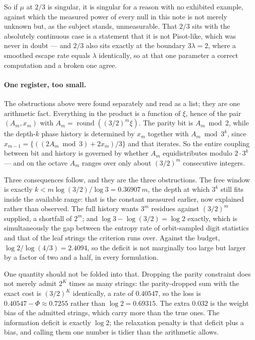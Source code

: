 \documentclass[11pt]{article}
\theoremstyle{remark}
\newcommand{\lam}{\lambda}
\begin{document}
So if $\mu$ at $2/3$ is singular, it is singular for a reason with no exhibited example, against which the
measured power of every null in this note is not merely unknown but, as the subject stands, unmeasurable.
That $2/3$ sits with the absolutely continuous case is a statement that it is not Pisot-like, which was
never in doubt --- and $2/3$ also sits exactly at the boundary $3\lam=2$, where a smoothed escape rate
equals $\lam$ identically, so at that one parameter a correct computation and a broken one agree.

\paragraph{One register, too small.} The obstructions above were found separately and read as a list; they
are one arithmetic fact. Everything in the product is a function of $\xi$, hence of the pair
$(A_m,x_m)$ with $A_m=\operatorname{round}((3/2)^m\xi)$. The parity bit is $A_m\bmod2$, while the depth-$k$
phase history is determined by $x_m$ together with $A_m\bmod3^k$, since
$x_{m-1}=\{((2A_m\bmod3)+2x_m)/3\}$ and that iterates. So the entire coupling between bit and history is
governed by whether $A_m$ equidistributes modulo $2\cdot3^k$ --- and on the octave $A_m$ ranges over only
about $(3/2)^m$ consecutive integers.

Three consequences follow, and they are the three obstructions. The free window is exactly
$k<m\log(3/2)/\log3=0.36907\,m$, the depth at which $3^k$ still fits inside the available range: that is
the constant measured earlier, now explained rather than observed. The full history wants $3^m$ residues
against $(3/2)^m$ supplied, a shortfall of $2^m$; and $\log3-\log(3/2)=\log2$ exactly, which is
simultaneously the gap between the entropy rate of orbit-sampled digit statistics and that of the leaf
strings the criterion runs over. Against the budget, $\log2/\log(4/3)=2.4094$, so the deficit is not
marginally too large but larger by a factor of two and a half, in every formulation.

One quantity should not be folded into that. Dropping the parity constraint does not merely admit $2^K$
times as many strings: the parity-dropped sum with the exact cost is $(3/2)^K$ identically, a rate of
$0.40547$, so the loss is $0.40547-\Phi\approx0.7255$ rather than $\log2=0.69315$. The extra $0.032$ is the
weight bias of the admitted strings, which carry more than the true ones. The information deficit is
exactly $\log2$; the relaxation penalty is that deficit plus a bias, and calling them one number is tidier
than the arithmetic allows.
\end{document}
